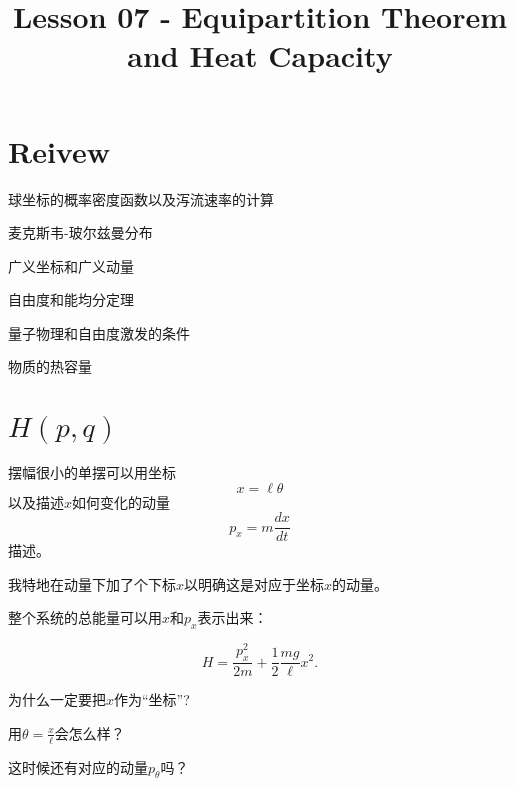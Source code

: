 \documentclass[CJK]{beamer}
\title{Lesson 07 - Equipartition Theorem and Heat Capacity}
\author{}
\date{}
\begin{document}

\section{Reivew}

\begin{frame}
\bch
{\large
\bitem
\item{球坐标的概率密度函数以及泻流速率的计算}
\item{麦克斯韦-玻尔兹曼分布}
\eitem}
\ech
\end{frame}

\begin{frame}
\bch
\bitem
\item{广义坐标和广义动量}
\item{自由度和能均分定理}
\item{量子物理和自由度激发的条件}    
\item{物质的热容量}  
\eitem
\ech
\end{frame}


\section{$H(p,q)$}



\begin{frame}
\bch
{}
\emini
{}
      {\large
        摆幅很小的单摆可以用坐标
        $$x = \ell \theta$$
        以及描述$x$如何变化的动量
        $$p_x = m \frac{dx}{dt}$$
        描述。
        
     我特地在动量下加了个下标$x$以明确这是对应于坐标$x$的动量。
      }
      \emini
      

      
{\large 整个系统的总能量可以用$x$和$p_x$表示出来：

$$H = \frac{p_x^2}{2m} + \frac{1}{2}\frac{mg}{\ell} x^2 . $$
}
      
\ech
\end{frame}


\begin{frame}
\bch
{}
\emini
{}
      {\large
        为什么一定要把$x$作为“坐标”?
        
        用$\theta=\frac{x}{\ell}$会怎么样？
        
        这时候还有对应的动量$p_\theta$吗？
}
     \emini
\ech
\end{frame}
\end{document}
